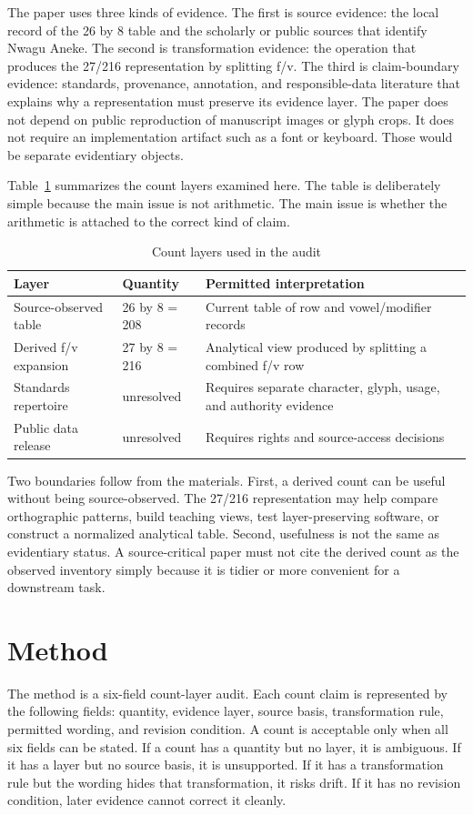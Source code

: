 \documentclass[sigconf,nonacm]{acmart}
\begin{document}
The paper uses three kinds of evidence. The first is source evidence: the local
record of the 26 by 8 table and the scholarly or public sources that identify
Nwagu Aneke. The second is transformation evidence: the operation that produces
the 27/216 representation by splitting f/v. The third is claim-boundary
evidence: standards, provenance, annotation, and responsible-data literature
that explains why a representation must preserve its evidence layer. The paper
does not depend on public reproduction of manuscript images or glyph crops. It
does not require an implementation artifact such as a font or keyboard. Those
would be separate evidentiary objects.

Table~\ref{tab:count_layers} summarizes the count layers examined here. The
table is deliberately simple because the main issue is not arithmetic. The main
issue is whether the arithmetic is attached to the correct kind of claim.

\begin{table}[t]
\caption{Count layers used in the audit}
\label{tab:count_layers}
\begin{tabular}{p{}p{}p{}}
\toprule
Layer & Quantity & Permitted interpretation \\
\midrule
Source-observed table & 26 by 8 = 208 & Current table of row and vowel/modifier records \\
Derived f/v expansion & 27 by 8 = 216 & Analytical view produced by splitting a combined f/v row \\
Standards repertoire & unresolved & Requires separate character, glyph, usage, and authority evidence \\
Public data release & unresolved & Requires rights and source-access decisions \\
\bottomrule
\end{tabular}
\end{table}

Two boundaries follow from the materials. First, a derived count can be useful
without being source-observed. The 27/216 representation may help compare
orthographic patterns, build teaching views, test layer-preserving software, or
construct a normalized analytical table. Second, usefulness is not the same as
evidentiary status. A source-critical paper must not cite the derived count as
the observed inventory simply because it is tidier or more convenient for a
downstream task.

\section{Method}
The method is a six-field count-layer audit. Each count claim is represented by
the following fields: quantity, evidence layer, source basis, transformation
rule, permitted wording, and revision condition. A count is acceptable only when
all six fields can be stated. If a count has a quantity but no layer, it is
ambiguous. If it has a layer but no source basis, it is unsupported. If it has a
transformation rule but the wording hides that transformation, it risks drift.
If it has no revision condition, later evidence cannot correct it cleanly.
\end{document}
